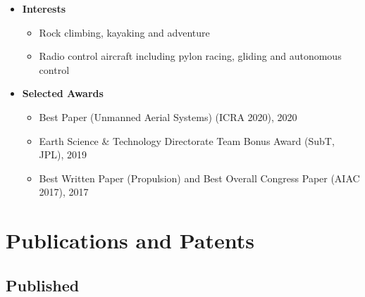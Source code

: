 \documentclass[12pt,letter,sans]{moderncv}        %
\begin{document}
\begin{itemize}

\vspace{4pt}

\item
{
    \textbf{Interests}
        \vspace{3pt} 
        \begin{itemize}
            \item Rock climbing, kayaking and adventure
            \item Radio control aircraft including pylon racing, gliding and autonomous control
        \end{itemize}
}

\vspace{4pt}
   
\item
{
    \textbf{Selected Awards}
        \vspace{3pt} 
        \begin{itemize}
            \item Best Paper (Unmanned Aerial Systems) (ICRA 2020), 2020
            \item Earth Science \& Technology Directorate Team Bonus Award (SubT, JPL), 2019
            \item Best Written Paper (Propulsion) and Best Overall Congress Paper (AIAC 2017), 2017
        \end{itemize}
}    
    
\end{itemize}

\newpage

\section{Publications and Patents}
\subsection{Published}
\end{document}
